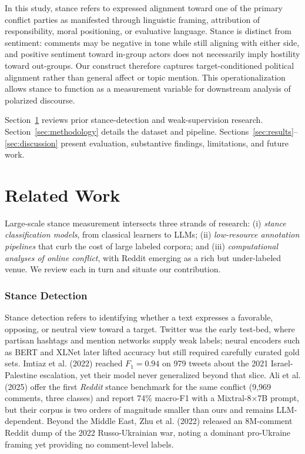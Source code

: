 \documentclass[letterpaper]{article} %
\begin{document}
In this study, stance refers to expressed alignment toward one of the primary conflict parties as manifested through linguistic framing, attribution of responsibility, moral positioning, or evaluative language. Stance is distinct from sentiment: comments may be negative in tone while still aligning with either side, and positive sentiment toward in-group actors does not necessarily imply hostility toward out-groups. Our construct therefore captures target-conditioned political alignment rather than general affect or topic mention. This operationalization allows stance to function as a measurement variable for downstream analysis of polarized discourse.

Section~\ref{sec:related-work} reviews prior stance-detection and weak-supervision research.  
Section~\ref{sec:methodology} details the dataset and pipeline.  
Sections~\ref{sec:results}--\ref{sec:discussion} present evaluation, substantive findings, limitations, and future work.



\section{Related Work}\label{sec:related-work}

Large-scale stance measurement intersects three strands of research: (i) \textit{stance classification models}, from classical learners to LLMs; (ii) \textit{low-resource annotation pipelines} that curb the cost of large labeled corpora; and (iii) \textit{computational analyses of online conflict}, with Reddit emerging as a rich but under-labeled venue. We review each in turn and situate our contribution.

\subsubsection{Stance Detection}

Stance detection refers to identifying whether a text expresses a favorable, opposing, or neutral view toward a target.  Twitter was the early test-bed, where partisan hashtags and mention networks supply weak labels; neural encoders such as BERT and XLNet later lifted accuracy but still required carefully curated gold sets. Imtiaz et al. (2022) \cite{imtiaz2022taking} reached $F_{1}=0.94$ on 979 tweets about the 2021 Israel-Palestine escalation, yet their model never generalized beyond that slice.  Ali et al. (2025) \cite{ali2025social} offer the first \emph{Reddit} stance benchmark for the same conflict (9,969 comments, three classes) and report 74\% macro-F1 with a Mixtral-8×7B prompt, but their corpus is two orders of magnitude smaller than ours and remains LLM-dependent.  Beyond the Middle East, Zhu et al. (2022) \cite{zhu2022reddit} released an 8M-comment Reddit dump of the 2022 Russo-Ukrainian war, noting a dominant pro-Ukraine framing yet providing no comment-level labels.
\end{document}

